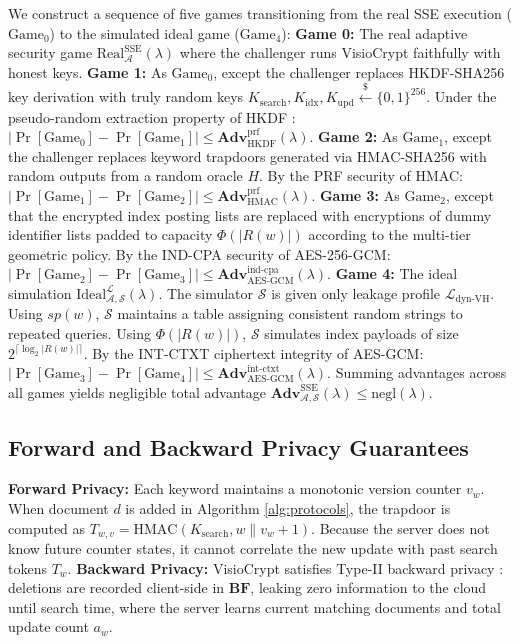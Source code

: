 \documentclass[10pt,conference]{IEEEtran}
\newenvironment{revised}{\color{revcolor}}{}
\begin{document}
\begin{revised}
\begin{IEEEproof}
We construct a sequence of five games transitioning from the real SSE execution ($\text{Game}_0$) to the simulated ideal game ($\text{Game}_4$):
\textbf{Game 0:} The real adaptive security game $\text{Real}_{\mathcal{A}}^{\text{SSE}}(\lambda)$ where the challenger runs VisioCrypt faithfully with honest keys.
\textbf{Game 1:} As $\text{Game}_0$, except the challenger replaces HKDF-SHA256 key derivation with truly random keys $K_{\text{search}}, K_{\text{idx}}, K_{\text{upd}} \xleftarrow{\$} \{0,1\}^{256}$. Under the pseudo-random extraction property of HKDF \cite{rfc5869}: $|\Pr[\text{Game}_0] - \Pr[\text{Game}_1]| \le \mathbf{Adv}_{\text{HKDF}}^{\text{prf}}(\lambda)$.
\textbf{Game 2:} As $\text{Game}_1$, except the challenger replaces keyword trapdoors generated via HMAC-SHA256 with random outputs from a random oracle $H$. By the PRF security of HMAC: $|\Pr[\text{Game}_1] - \Pr[\text{Game}_2]| \le \mathbf{Adv}_{\text{HMAC}}^{\text{prf}}(\lambda)$.
\textbf{Game 3:} As $\text{Game}_2$, except that the encrypted index posting lists are replaced with encryptions of dummy identifier lists padded to capacity $\Phi(|R(w)|)$ according to the multi-tier geometric policy. By the IND-CPA security of AES-256-GCM: $|\Pr[\text{Game}_2] - \Pr[\text{Game}_3]| \le \mathbf{Adv}_{\text{AES-GCM}}^{\text{ind-cpa}}(\lambda)$.
\textbf{Game 4:} The ideal simulation $\text{Ideal}_{\mathcal{A},\mathcal{S}}^{\mathcal{L}}(\lambda)$. The simulator $\mathcal{S}$ is given only leakage profile $\mathcal{L}_{\text{dyn-VH}}$. Using $sp(w)$, $\mathcal{S}$ maintains a table assigning consistent random strings to repeated queries. Using $\Phi(|R(w)|)$, $\mathcal{S}$ simulates index payloads of size $2^{\lceil \log_2 |R(w)| \rceil}$. By the INT-CTXT ciphertext integrity of AES-GCM: $|\Pr[\text{Game}_3] - \Pr[\text{Game}_4]| \le \mathbf{Adv}_{\text{AES-GCM}}^{\text{int-ctxt}}(\lambda)$.
Summing advantages across all games yields negligible total advantage $\mathbf{Adv}_{\mathcal{A},\mathcal{S}}^{\text{SSE}}(\lambda) \le \text{negl}(\lambda)$.
\end{IEEEproof}

\subsection{Forward and Backward Privacy Guarantees}
\textbf{Forward Privacy:} Each keyword maintains a monotonic version counter $v_w$. When document $d$ is added in Algorithm \ref{alg:protocols}, the trapdoor is computed as $T_{w,v} = \text{HMAC}(K_{\text{search}}, w \parallel v_w + 1)$. Because the server does not know future counter states, it cannot correlate the new update with past search tokens $T_w$.
\textbf{Backward Privacy:} VisioCrypt satisfies Type-II backward privacy \cite{bost2017diana}: deletions are recorded client-side in $\mathbf{BF}$, leaking zero information to the cloud until search time, where the server learns current matching documents and total update count $a_w$.


\end{revised}
\end{document}
